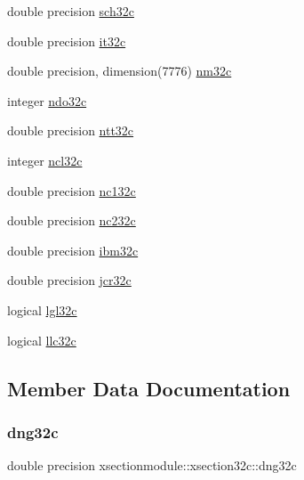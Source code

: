 \begin{DoxyCompactItemize}
\item 
double precision \hyperlink{structxsectionmodule_1_1xsection32c_a8edf7ac2f8a874880caf7c4eb4a6033e}{sch32c}
\item 
double precision \hyperlink{structxsectionmodule_1_1xsection32c_ab33c9bf9ce5f669387a0ec9548ff5576}{it32c}
\item 
double precision, dimension(7776) \hyperlink{structxsectionmodule_1_1xsection32c_ad16a69bdd9a0a17ad0f3eb6eb5279b8b}{nm32c}
\item 
integer \hyperlink{structxsectionmodule_1_1xsection32c_afefbf2ded4d4d4f60246c5e1e66f9949}{ndo32c}
\item 
double precision \hyperlink{structxsectionmodule_1_1xsection32c_a639f9a271e803d7732bd5f5bd5187f2f}{ntt32c}
\item 
integer \hyperlink{structxsectionmodule_1_1xsection32c_a0fb68b92d75af157a3b85996f7143ece}{ncl32c}
\item 
double precision \hyperlink{structxsectionmodule_1_1xsection32c_af6f58711a0942fbf22a5f2b460af3133}{nc132c}
\item 
double precision \hyperlink{structxsectionmodule_1_1xsection32c_a3b1abbe11b07fdf3e02d0562cee9a0c3}{nc232c}
\item 
double precision \hyperlink{structxsectionmodule_1_1xsection32c_a32074c7a8ae725cc12469be6854a45b7}{ibm32c}
\item 
double precision \hyperlink{structxsectionmodule_1_1xsection32c_a31976a6679f1be2950126f91941eef44}{jcr32c}
\item 
logical \hyperlink{structxsectionmodule_1_1xsection32c_ad95680b8e0d51f7d20481c293b2ad47f}{lgl32c}
\item 
logical \hyperlink{structxsectionmodule_1_1xsection32c_a92095d615cc359b37d584269b9fda0e1}{llc32c}
\end{DoxyCompactItemize}


\subsection{Member Data Documentation}
\mbox{\label{structxsectionmodule_1_1xsection32c_ab17e16bd0e187b7190bcbb8243c4e811}} 
\subsubsection{\texorpdfstring{dng32c}{dng32c}}
{\footnotesize\ttfamily double precision xsectionmodule\+::xsection32c\+::dng32c}

